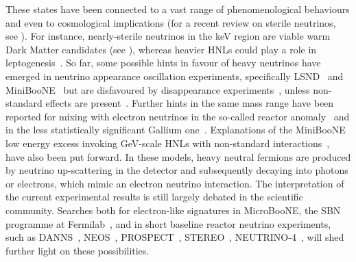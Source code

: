 These states have been connected to a vast range of phenomenological behaviours and %
even to cosmological implications (for a recent review on sterile neutrinos, see \eg {}).
For instance, nearly-sterile neutrinos in the keV region are viable warm Dark Matter candidates (see \eg {}), %
whereas heavier HNLs could play a role in leptogenesis~\cite{Fukugita:1986hr, Covi:1996wh, Pilaftsis:1997jf, Buchmuller:1997yu, %
Pilaftsis:2003gt, Davidson:2008bu, Akhmedov:1998qx, Asaka:2005pn, Hernandez:2015wna, Hernandez:2016kel, %
Hambye:2016sby, Hambye:2017elz, Drewes:2017zyw}.
So far, some possible hints in favour of heavy neutrinos have emerged in neutrino appearance oscillation experiments, %
specifically LSND~\cite{Aguilar:2001ty} and MiniBooNE~\cite{Aguilar-Arevalo:2012fmn, Aguilar-Arevalo:2013pmq, Aguilar-Arevalo:2018gpe} %
but are disfavoured by disappearance experiments~\cite{TheIceCube:2016oqi, Adamson:2017uda, Aartsen:2017bap}, %
unless non-standard effects are present~\cite{Liao:2016reh, Liao:2018mbg, Esmaili:2018qzu, Denton:2018dqq}. Further hints 
in the same mass range have been reported for mixing with electron neutrinos in the so-called reactor anomaly~\cite{Mueller:2011nm, Mention:2011rk, Huber:2011wv, Ko:2016owz, Alekseev:2018efk} and in the less statistically significant Gallium one~\cite{Abdurashitov:2005tb, Laveder:2007zz, Giunti:2006bj}.
Explanations of the MiniBooNE low energy excess invoking GeV-scale HNLs with non-standard interactions~\cite{Gninenko:2009ks, Gninenko:2010pr, %
	Masip:2012ke, Bertuzzo:2018itn, Ballett:2018ynz}, %
have also been put forward. In these models, heavy neutral fermions are produced by neutrino up-scattering in the detector and subsequently decaying into photons or electrons, which mimic an electron neutrino interaction.
The interpretation of the current experimental results is still largely debated in the scientific community.
Searches both for electron-like signatures in MicroBooNE, the SBN programme at Fermilab~\cite{Antonello:2015lea}, %
and in short baseline reactor neutrino experiments, such as DANNS~\cite{Alekseev:2018efk}, NEOS~\cite{Ko:2016owz}, %
PROSPECT~\cite{Ashenfelter:2018iov}, STEREO~\cite{Almazan:2018wln}, NEUTRINO-4~\cite{Serebrov:2018vdw}, %
will shed further light on these possibilities.

